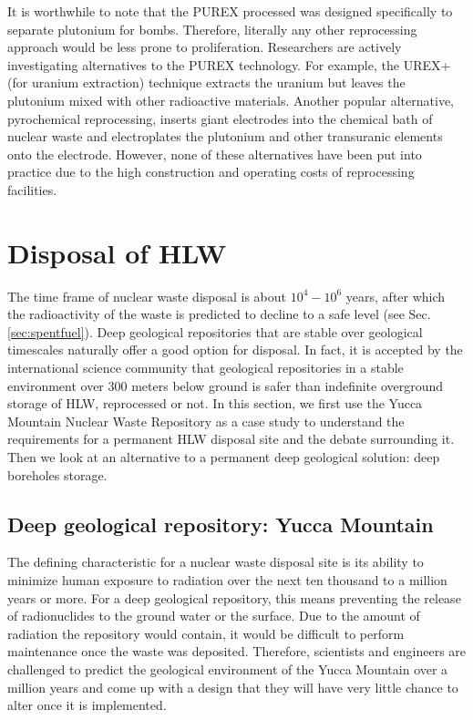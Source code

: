 \documentclass[nofootinbib,preprint,aps]{revtex4-1}
\newcommand{\red}[1]{\textcolor{red}{\bf #1}}
\begin{document}
    It is worthwhile to note that the PUREX processed was designed specifically to separate plutonium for
    bombs. Therefore, literally any other reprocessing approach would be less prone to proliferation.
    Researchers are actively investigating alternatives to the PUREX technology. For example, the UREX+ (for
    uranium extraction) technique extracts the uranium but leaves the plutonium mixed with other
    radioactive materials. Another popular alternative, pyrochemical reprocessing, inserts giant electrodes
    into the chemical bath of nuclear waste and electroplates the plutonium and other transuranic elements onto
    the electrode. However, none of these alternatives have been put into practice due to the high construction
    and operating costs of reprocessing facilities.\cite{aa12}



\section{Disposal of HLW}
\label{sec:disposal}
    The time frame of nuclear waste disposal is about $10^4-10^6$ years, after which the radioactivity
    of the waste is predicted to decline to a safe level (see Sec.\ref{sec:spentfuel}).
    Deep geological repositories that are stable over geological timescales naturally offer a good option for disposal.
    In fact, it is accepted by the international science community that geological repositories in a stable environment over 300 meters below ground
    is safer than indefinite overground storage of HLW, reprocessed or not.\cite{fmr11}
    In this section, we first use the Yucca Mountain Nuclear Waste
    Repository as a case study to understand the requirements for a permanent HLW disposal site and the debate
    surrounding it.
    Then we look at an alternative to a permanent deep geological solution:
    deep boreholes storage.
    \subsection{Deep geological repository: Yucca Mountain}
        The defining characteristic for a nuclear waste disposal site is its ability to minimize human
        exposure to radiation over the next ten thousand to a million years or more.
        For a deep geological repository, this means preventing the release
        of radionuclides to the ground water or the surface.
        Due to the amount of radiation the repository would contain, it would be difficult to perform
        maintenance once the waste was deposited. Therefore, scientists and engineers are challenged
        to predict the geological environment of the Yucca Mountain over a million years and come up
        with a design that they will have very little chance to alter once it is implemented.
\end{document}
